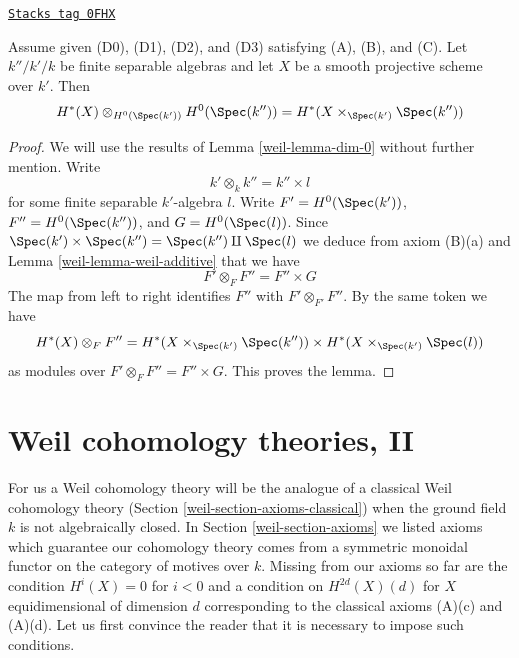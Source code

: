 \begin{lemma}[Otimes]
\label{weil-lemma-otimes}
\href{https://stacks.math.columbia.edu/tag/0FHX}{\texttt{Stacks tag 0FHX}}

Assume given (D0), (D1), (D2), and (D3) satisfying (A), (B), and (C). Let
$k''/k'/k$ be finite separable algebras and let $X$ be a
smooth projective scheme over $k'$. Then
$$
H^*(X) \otimes_{H^0(\Spec(k'))} H^0(\Spec(k'')) =
H^*(X \times_{\Spec(k')} \Spec(k''))
$$
\end{lemma}

\begin{proof}

We will use the results of Lemma \ref{weil-lemma-dim-0} without further mention.
Write
$$
k' \otimes_k k'' = k'' \times l
$$
for some finite separable $k'$-algebra $l$. Write
$F' = H^0(\Spec(k'))$, $F'' = H^0(\Spec(k''))$, and $G = H^0(\Spec(l))$.
Since $\Spec(k') \times \Spec(k'') = \Spec(k'') \amalg \Spec(l)$ we
deduce from axiom (B)(a) and Lemma \ref{weil-lemma-weil-additive}
that we have
$$
F' \otimes_F F'' = F'' \times G
$$
The map from left to right identifies $F''$ with $F' \otimes_{F'} F''$.
By the same token we have
$$
H^*(X) \otimes_F F'' = H^*(X \times_{\Spec(k')} \Spec(k''))
\times H^*(X \times_{\Spec(k')} \Spec(l))
$$
as modules over $F' \otimes_F F'' = F'' \times G$. This proves the lemma.
\end{proof}

\section{Weil cohomology theories, II}
\label{weil-section-old}
For us a Weil cohomology theory will be the analogue of a
classical Weil cohomology theory (Section \ref{weil-section-axioms-classical})
when the ground field $k$ is not algebraically closed.
In Section \ref{weil-section-axioms} we listed axioms which guarantee
our cohomology theory comes from a symmetric monoidal functor
on the category of motives over $k$. Missing from our axioms so
far are the condition $H^i(X) = 0$ for $i < 0$ and
a condition on $H^{2d}(X)(d)$ for $X$ equidimensional of dimension $d$
corresponding to the classical axioms (A)(c) and (A)(d).
Let us first convince the reader that it is necessary to impose
such conditions.

